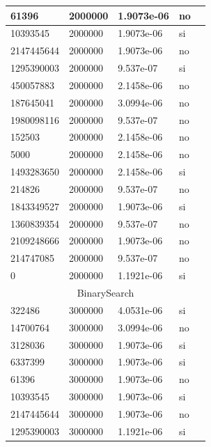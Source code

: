 \documentclass[12pt, fleqn]{article}                             %
\theoremstyle{break}                                            %
\begin{document}
\begin{longtable}{|m{5em}|m{5em}|m{10em}|m{5em}|@{}m{0pt}@{}}
            61396& 2000000  & 1.9073e-06 & no &\\[1em]    \hline
            10393545& 2000000  & 1.9073e-06 & si &\\[1em]    \hline
            2147445644& 2000000  & 1.9073e-06 & no &\\[1em]    \hline
            1295390003& 2000000  & 9.537e-07 & si &\\[1em]    \hline
            450057883& 2000000  & 2.1458e-06 & no &\\[1em]    \hline
            187645041& 2000000  & 3.0994e-06 & no &\\[1em]    \hline
            1980098116& 2000000  & 9.537e-07 & no &\\[1em]    \hline
            152503& 2000000  & 2.1458e-06 & no &\\[1em]    \hline
            5000& 2000000  & 2.1458e-06 & no &\\[1em]    \hline
            1493283650& 2000000  & 2.1458e-06 & si &\\[1em]    \hline
            214826& 2000000  & 9.537e-07 & no &\\[1em]    \hline
            1843349527& 2000000  & 1.9073e-06 & si &\\[1em]    \hline
            1360839354& 2000000  & 9.537e-07 & no &\\[1em]    \hline
            2109248666& 2000000  & 1.9073e-06 & no &\\[1em]    \hline
            214747085& 2000000  & 9.537e-07 & no &\\[1em]    \hline
            0& 2000000  & 1.1921e-06 & si &\\[1em]    \hline
            \multicolumn{5}{|c|}{BinarySearch}   \\          \hline
            322486& 3000000  & 4.0531e-06 & si &\\[1em]    \hline
            14700764& 3000000  & 3.0994e-06 & no &\\[1em]    \hline
            3128036& 3000000  & 1.9073e-06 & si &\\[1em]    \hline
            6337399& 3000000  & 1.9073e-06 & si &\\[1em]    \hline
            61396& 3000000  & 1.9073e-06 & no &\\[1em]    \hline
            10393545& 3000000  & 1.9073e-06 & si &\\[1em]    \hline
            2147445644& 3000000  & 1.9073e-06 & no &\\[1em]    \hline
            1295390003& 3000000  & 1.1921e-06 & si &\\[1em]    \hline

\end{longtable}
\end{document}
